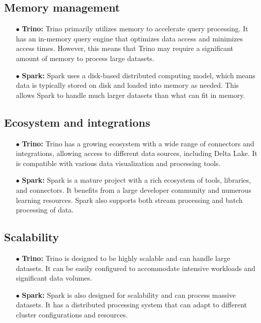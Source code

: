 \subsection{Memory management}
\begin{enumerate}
\item[$\bullet$] \textbf{Trino:} Trino primarily utilizes memory to accelerate query processing. It has an in-memory query engine that optimizes data access and minimizes access times. However, this means that Trino may require a significant amount of memory to process large datasets.
\item[$\bullet$] \textbf{Spark:} Spark uses a disk-based distributed computing model, which means data is typically stored on disk and loaded into memory as needed. This allows Spark to handle much larger datasets than what can fit in memory.
\end{enumerate}

\subsection{Ecosystem and integrations}
\begin{enumerate}
\item[$\bullet$] \textbf{Trino:} Trino has a growing ecosystem with a wide range of connectors and integrations, allowing access to different data sources, including Delta Lake. It is compatible with various data visualization and processing tools.
\item[$\bullet$] \textbf{Spark:} Spark is a mature project with a rich ecosystem of tools, libraries, and connectors. It benefits from a large developer community and numerous learning resources. Spark also supports both stream processing and batch processing of data.
\end{enumerate}

\subsection{Scalability}
\begin{enumerate}
\item[$\bullet$] \textbf{Trino:} Trino is designed to be highly scalable and can handle large datasets. It can be easily configured to accommodate intensive workloads and significant data volumes.
\item[$\bullet$] \textbf{Spark:} Spark is also designed for scalability and can process massive datasets. It has a distributed processing system that can adapt to different cluster configurations and resources.
\end{enumerate}

